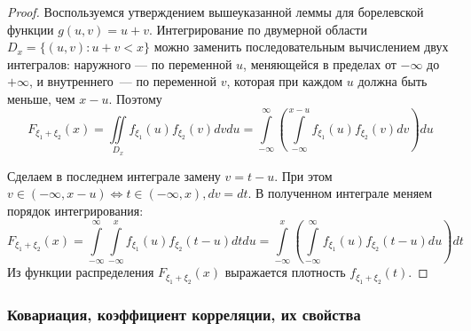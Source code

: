 \begin{proof}
    Воспользуемся утверждением вышеуказанной леммы для борелевской функции $g(u, v)=u+v$. Интегрирование по двумерной области $D_{x}=\{(u, v) \colon u+v<x\}$ можно заменить последовательным вычислением двух интегралов: наружного — по переменной $u$, меняющейся в пределах от $-\infty$ до $+\infty$, и внутреннего~--- по переменной $v$, которая при каждом $u$ должна быть меньше, чем $x-u$. Поэтому
    \begin{equation*}
        F_{\xi_{1}+\xi_{2}}(x)=\iint\limits_{D_{x}} f_{\xi_{1}}(u) f_{\xi_{2}}(v) d v d u=\int\limits_{-\infty}^{\infty}\left(\int\limits_{-\infty}^{x-u} f_{\xi_{1}}(u) f_{\xi_{2}}(v) d v\right) d u
    \end{equation*}
    
    Сделаем в последнем интеграле замену $v=t-u$. При этом $v \in(-\infty, x-u) \Leftrightarrow t \in(-\infty, x), d v=d t$. В полученном интеграле меняем порядок интегрирования:
    \begin{equation*}
        F_{\xi_{1}+\xi_{2}}(x)=\int\limits_{-\infty}^{\infty} \int\limits_{-\infty}^{x} f_{\xi_{1}}(u) f_{\xi_{2}}(t-u) d t d u=\int\limits_{-\infty}^{x}\left(\int\limits_{-\infty}^{\infty} f_{\xi_{1}}(u) f_{\xi_{2}}(t-u) d u\right) d t
    \end{equation*}
    Из функции распределения $F_{\xi_{1}+\xi_{2}}(x)$ выражается плотность $f_{\xi_{1}+\xi_{2}}(t)$.
\end{proof}

\subsubsection{Ковариация, коэффициент корреляции, их свойства}

